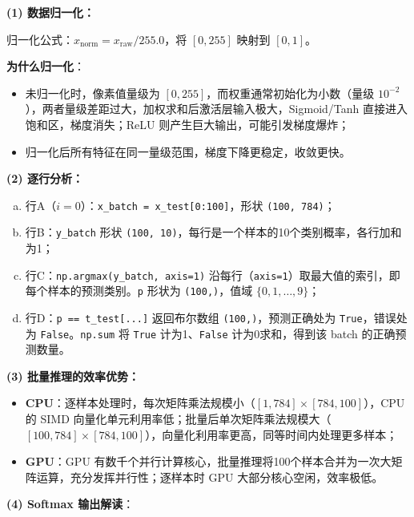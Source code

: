 \documentclass[a4paper,11pt]{ctexart}
\begin{document}
\begin{solutionbox}[参考答案与详细解析]
    \textbf{(1) 数据归一化：}

    归一化公式：$x_{\text{norm}} = x_{\text{raw}} / 255.0$，将 $[0,255]$ 映射到 $[0,1]$。

    \textbf{为什么归一化}：
    \begin{itemize}
        \item 未归一化时，像素值量级为 $[0,255]$，而权重通常初始化为小数（量级 $10^{-2}$），两者量级差距过大，加权求和后激活层输入极大，Sigmoid/Tanh 直接进入饱和区，梯度消失；ReLU 则产生巨大输出，可能引发梯度爆炸；
        \item 归一化后所有特征在同一量级范围，梯度下降更稳定，收敛更快。
    \end{itemize}

    \textbf{(2) 逐行分析：}

    \begin{enumerate}[a.]
        \item 行A（$i=0$）：\texttt{x\_batch = x\_test[0:100]}，形状 \texttt{(100, 784)}；
        \item 行B：\texttt{y\_batch} 形状 \texttt{(100, 10)}，每行是一个样本的10个类别概率，各行加和为1；
        \item 行C：\texttt{np.argmax(y\_batch, axis=1)} 沿每行（\texttt{axis=1}）取最大值的索引，即每个样本的预测类别。\texttt{p} 形状为 \texttt{(100,)}，值域 $\{0,1,\ldots,9\}$；
        \item 行D：\texttt{p == t\_test[...]} 返回布尔数组 \texttt{(100,)}，预测正确处为 \texttt{True}，错误处为 \texttt{False}。\texttt{np.sum} 将 \texttt{True} 计为1、\texttt{False} 计为0求和，得到该 batch 的正确预测数量。
    \end{enumerate}

    \textbf{(3) 批量推理的效率优势：}

    \begin{itemize}
        \item \textbf{CPU}：逐样本处理时，每次矩阵乘法规模小（$[1,784]\times[784,100]$），CPU 的 SIMD 向量化单元利用率低；批量后单次矩阵乘法规模大（$[100,784]\times[784,100]$），向量化利用率更高，同等时间内处理更多样本；
        \item \textbf{GPU}：GPU 有数千个并行计算核心，批量推理将100个样本合并为一次大矩阵运算，充分发挥并行性；逐样本时 GPU 大部分核心空闲，效率极低。
    \end{itemize}

    \textbf{(4) Softmax 输出解读}：


\end{solutionbox}
\end{document}

